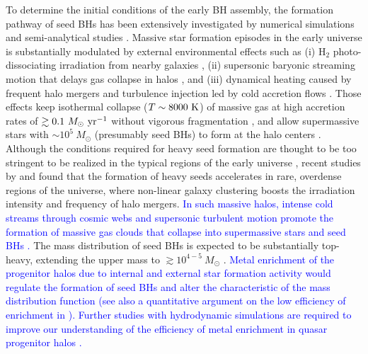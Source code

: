 \documentclass[twocolumn, twocolappendix]{aastex63}
\newcommand{\Msun}{M_\odot}
\newcommand{\Msunyr}{M_\odot~{\rm yr}^{-1}}
\newcommand{\blue}[1]{\textcolor{blue}{ #1}}
\begin{document}
\begin{CJK*}{UTF8}{gbsn}
To determine the initial conditions of the early BH assembly,
the formation pathway of seed BHs has been extensively investigated by numerical simulations and semi-analytical studies
\citep{2006MNRAS.370..289B,2009MNRAS.396..343R,2009ApJ...696.1798T,2012MNRAS.422.2051N,2014ApJ...781...60H,
2015MNRAS.448..568H,2018MNRAS.474.3825V,2021MNRAS.506..613S,2022arXiv220614459T,2022arXiv220505717B}.
Massive star formation episodes in the early universe is substantially modulated by external environmental effects such as
(i) H$_2$ photo-dissociating irradiation from nearby galaxies
\citep{2001ApJ...546..635O,2002ApJ...569..558O,2003Natur.425..812B,2010MNRAS.402.1249S,2014MNRAS.445..544S,2014MNRAS.445..107V,2016ApJ...832..134C},
(ii) supersonic baryonic streaming motion that delays gas collapse in halos
\citep{2012MNRAS.424.1335F, 2014MNRAS.439.1092T, 2018ApJ...855...17H,2017MNRAS.471.4878S,2018MNRAS.479.4017I},
and (iii) dynamical heating caused by frequent halo mergers and turbulence injection led by cold accretion flows
\citep{2003ApJ...592..645Y,2010Natur.466.1082M,2015ApJ...810...51M,2019Natur.566...85W,2022Natur.607...48L}.
Those effects keep isothermal collapse ($T\sim 8000~{\rm K}$) of massive gas at high accretion rates of $\gtrsim 0.1~\Msunyr$
without vigorous fragmentation \citep{2014MNRAS.445L.109I,2015MNRAS.446.2380B,2016PASA...33...51L},
and allow supermassive stars with $\sim 10^5~\Msun$ (presumably seed BHs) to form at the halo centers 
\citep{2013ApJ...778..178H,2013A&A...558A..59S,2019PASA...36...27W,2022arXiv220614459T}.
Although the conditions required for heavy seed formation are thought to be too stringent to be realized in the typical regions of the early universe
\citep{2008MNRAS.391.1961D,2009ApJ...695.1430A,2015MNRAS.450.4350I},
recent studies by \citet{2021MNRAS.503.5046L} and \citet{2021ApJ...917...60L} found that the formation of heavy seeds
accelerates in rare, overdense regions of the universe, where non-linear galaxy clustering boosts the irradiation intensity
and frequency of halo mergers.
\blue{In such massive halos, intense cold streams through cosmic webs and supersonic turbulent motion promote the formation
of massive gas clouds that collapse into supermassive stars and seed BHs \citep{2009Natur.457..451D,2012MNRAS.422.2539I,2022Natur.607...48L}.}
The mass distribution of seed BHs is expected to be substantially top-heavy, extending the upper mass to $\gtrsim 10^{4-5}~\Msun$
\citep{2021ApJ...917...60L, 2022arXiv220614459T}.
\blue{
Metal enrichment of the progenitor halos due to internal and external star formation activity would regulate the formation of 
seed BHs and alter the characteristic of the mass distribution function (see also a quantitative argument on the low efficiency of enrichment in 
\citealt{2021ApJ...917...60L}).
Further studies with hydrodynamic simulations are required to improve our understanding of the efficiency of metal enrichment in quasar progenitor halos
\citep[e.g.,][]{2018MNRAS.475.4378C}.
}



\end{CJK*}
\end{document}
